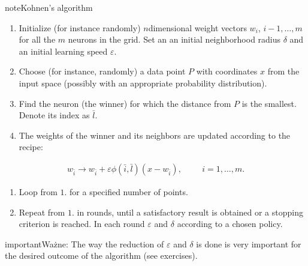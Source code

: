 \documentclass[a4paper,12pt,polish]{jupyterBook}
\begin{document}
\begin{sphinxadmonition}{note}{Kohnen’s algorithm}
\begin{enumerate}
%
\item {} 
\sphinxAtStartPar
Initialize (for instance randomly) \(n\)\sphinxhyphen{}dimensional weight vectors \(w_i\), \(i-1,\dots,m\) for all the \(m\) neurons in the grid. Set an an initial neighborhood radius \( \delta \) and an initial learning speed \( \varepsilon \).

\item {} 
\sphinxAtStartPar
Choose (for instance, randomly) a data point \(P\) with coordinates \(x\) from the input space (possibly with an appropriate probability distribution).

\item {} 
\sphinxAtStartPar
Find the neuron (the winner) for which the distance from \(P\) is the smallest. Denote its index as \( \bar {l} \).

\item {} 
\sphinxAtStartPar
The weights of the winner and its neighbors are updated according to the  recipe:

\end{enumerate}
\begin{equation*}
\begin{split}w_{\bar{i}} \to w_{\bar{i}} + \varepsilon \phi(\bar{i}, \bar{l})(x - w_{\bar{i}}), \hspace{1cm} i=1, \dots , m. 
\end{split}
\end{equation*}\begin{enumerate}
%
\item {} 
\sphinxAtStartPar
Loop from \(1.\) for a specified number of points.

\item {} 
\sphinxAtStartPar
Repeat from \(1.\) in rounds, until a satisfactory result is obtained or a stopping criterion is reached. In each round   \( \varepsilon \) and \( \delta \) according to a chosen policy.

\end{enumerate}
\end{sphinxadmonition}

\begin{sphinxadmonition}{important}{Ważne:}
\sphinxAtStartPar
The way the reduction of \( \varepsilon \) and \( \delta \) is done is very important for the desired outcome of the algorithm (see exercises).
\end{sphinxadmonition}
\end{document}

